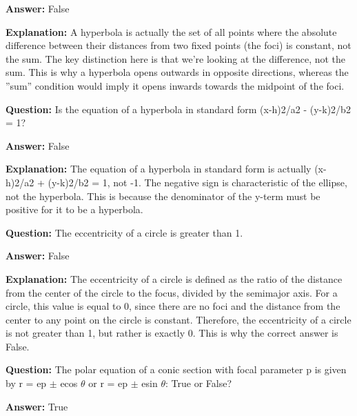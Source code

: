\documentclass{article}
\begin{document}
                \textbf{Answer:} False

                \textbf{Explanation:} A hyperbola is actually the set of all points where the absolute difference between their distances from two fixed points (the foci) is constant, not the sum. The key distinction here is that we're looking at the difference, not the sum. This is why a hyperbola opens outwards in opposite directions, whereas the ''sum'' condition would imply it opens inwards towards the midpoint of the foci.
                
                \vspace{0.5cm} 
        
            
                \textbf {Question:} Is the equation of a hyperbola in standard form (x-h)2/a2 - (y-k)2/b2 = 1?
                
                \textbf{Answer:} False

                \textbf{Explanation:} The equation of a hyperbola in standard form is actually (x-h)2/a2 + (y-k)2/b2 = 1, not -1. The negative sign is characteristic of the ellipse, not the hyperbola. This is because the denominator of the y-term must be positive for it to be a hyperbola.
                
                \vspace{0.5cm} 
        
            
                \textbf {Question:} The eccentricity of a circle is greater than 1.
                
                \textbf{Answer:} False

                \textbf{Explanation:} The eccentricity of a circle is defined as the ratio of the distance from the center of the circle to the focus, divided by the semimajor axis. For a circle, this value is equal to 0, since there are no foci and the distance from the center to any point on the circle is constant. Therefore, the eccentricity of a circle is not greater than 1, but rather is exactly 0. This is why the correct answer is False.
                
                \vspace{0.5cm} 
        
            
                \textbf {Question:} The polar equation of a conic section with focal parameter p is given by r = ep \ensuremath{\pm} ecos \ensuremath{\theta} or r = ep \ensuremath{\pm} esin \ensuremath{\theta}: True or False?
                
                \textbf{Answer:} True
\end{document}
